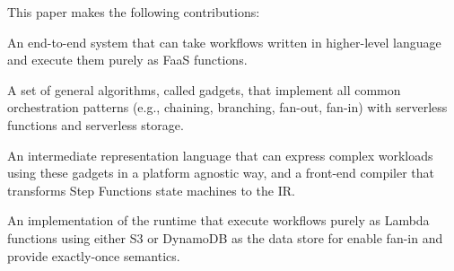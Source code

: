 



This paper makes the following contributions:

\squishlist

  \item An end-to-end system that can take workflows written in higher-level
  language and execute them purely as FaaS functions.

  \item A set of general algorithms, called gadgets, that implement all common
  orchestration patterns (e.g., chaining, branching, fan-out, fan-in) with
  serverless functions and serverless storage.

  \item An intermediate representation language that can express complex
  workloads using these gadgets in a platform agnostic way, and a front-end
  compiler that transforms Step Functions state machines to the IR.

  \item An implementation of the \name{} runtime that execute workflows purely
  as Lambda functions using either S3 or DynamoDB as the data store for enable
  fan-in and provide exactly-once semantics.

\squishend

